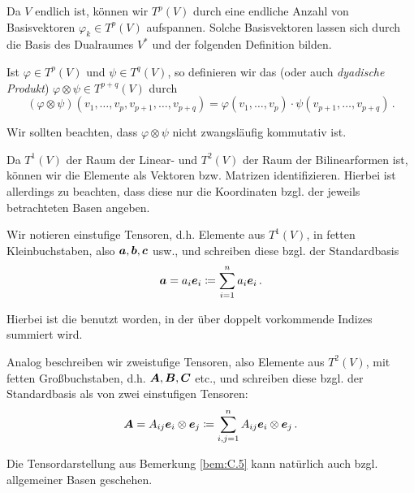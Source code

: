 \begin{bem}\label{bem:C.3}
Da $V$ endlich ist, können wir $T^p(V)$ durch eine endliche Anzahl von Basisvektoren $\varphi_k \in T^p(V)$ aufspannen. Solche Basisvektoren lassen sich durch die Basis des Dualraumes $V^*$ und der folgenden Definition bilden.
\end{bem}

\begin{defi}\label{def:C.4}
Ist $\varphi \in T^p(V)$ und $\psi \in T^q(V)$, so definieren wir das \textit{} (oder auch \textit{dyadische Produkt}) $\varphi \otimes \psi \in T^{p+q}(V)$ durch
\[
	(\varphi \otimes \psi)(v_1,\dots,v_p,v_{p+1},\dots,v_{p+q}) = \varphi (v_1,\dots,v_p)\cdot \psi (v_{p+1},\dots,v_{p+q}) \, .
\]
\end{defi}

\begin{bem*}
Wir sollten beachten, dass $\varphi \otimes \psi$ nicht zwangsläufig kommutativ ist.
\end{bem*}

\begin{bem}\label{bem:C.5}
Da $T^1(V)$ der Raum der Linear- und $T^2(V)$ der Raum der Bilinearformen ist, können wir die Elemente als Vektoren bzw. Matrizen identifizieren. Hierbei ist allerdings zu beachten, dass diese nur die Koordinaten bzgl. der jeweils betrachteten Basen angeben.

Wir notieren einstufige Tensoren, d.h. Elemente aus $T^1(V)$, in fetten Kleinbuchstaben, also $\boldsymbol a, \boldsymbol b, \boldsymbol c$ usw., und schreiben diese bzgl. der Standardbasis
\[
	\boldsymbol a = a_i \boldsymbol e_i \coloneqq \sum_{i=1}^n a_i \boldsymbol e_i \, .
\]

Hierbei ist die \textit{} benutzt worden, in der über doppelt vorkommende Indizes summiert wird.

Analog beschreiben wir zweistufige Tensoren, also Elemente aus $T^2(V)$, mit fetten Großbuchstaben, d.h. $\boldsymbol A, \boldsymbol B, \boldsymbol C$ etc., und schreiben diese bzgl. der Standardbasis als  von zwei einstufigen Tensoren:
\[
	\boldsymbol A = A_{ij} \boldsymbol e_i \otimes \boldsymbol e_j \coloneqq \sum_{i,j=1}^n A_{ij} \boldsymbol e_i \otimes \boldsymbol e_j \, .
\]
\end{bem}

\begin{bem*}
Die Tensordarstellung aus Bemerkung \ref{bem:C.5} kann natürlich auch bzgl. allgemeiner Basen geschehen.
\end{bem*}

